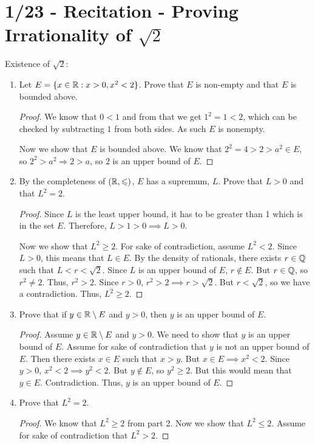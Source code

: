 \documentclass{report}
\begin{document}
\section{1/23 - Recitation - Proving Irrationality of $\sqrt{2}$}
Existence of $\sqrt{2}$:
\begin{enumerate}
    \item Let $E = \{x \in \RR : x >0, x^2 < 2\}$. Prove that $E$ is non-empty and that $E$ is bounded above.
    \begin{proof}
        We know that $0 < 1$ and from that we get $1^2  = 1 < 2$, which can be checked by subtracting $1$ from both sides. As such $E$ is nonempty.

        Now we show that $E$ is bounded above. We know that $2^2 = 4 > 2 > a^2 \in E$, so $2^2 > a^2 \Rightarrow 2 > a$, so $2$ is an upper bound of $E$.
    \end{proof}
    \item By the completeness of $(\RR, \leq)$, $E$ has a supremum, $L$. Prove that $L > 0$ and that $L^2 = 2$.
    \begin{proof}
        Since $L$ is the least upper bound, it has to be greater than 1 which is in the set $E$. Therefore, $L > 1 > 0 \implies L > 0$. 

        Now we show that $L^2 \geq 2$. For sake of contradiction, assume $L^2 < 2$. Since $L > 0$, this means that $ L \in E$. By the density of rationals, there exists $r \in \QQ$ such that $L < r < \sqrt{2}$. Since $L$ is an upper bound of $E$, $r \notin E$. But $r \in \QQ$, so $r^2 \neq 2$. Thus, $r^2 > 2$. Since $r > 0$, $r^2 > 2 \implies r > \sqrt{2}$. But $r < \sqrt{2}$, so we have a contradiction. Thus, $L^2 \geq 2$.
    \end{proof}
    \item Prove that if $y \in \RR \setminus E$ and $y > 0$, then $y$ is an upper bound of $E$.
    \begin{proof}
        Assume $y \in \RR \setminus E$ and $y > 0$. We need to show that $y$ is an upper bound of $E$. Assume for sake of contradiction that $y$ is not an upper bound of $E$. Then there exists $x \in E$ such that $x > y$. But $x \in E \implies x^2 < 2$. Since $y > 0$, $x^2 < 2 \implies y^2 < 2$. But $y \notin E$, so $y^2 \geq 2$. But this would mean that $y \in E$. Contradiction. Thus, $y$ is an upper bound of $E$.
    \end{proof}
    \item Prove that $L^2 = 2$.
    \begin{proof}
        We know that $L^2 \geq 2$ from part 2. Now we show that $L^2 \leq 2$. Assume for sake of contradiction that $L^2 > 2$. 


\end{proof}
\end{enumerate}
\end{document}

